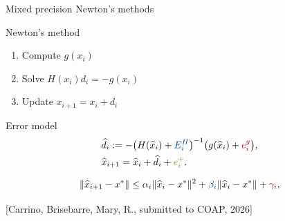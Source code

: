 \documentclass{beamer}
\def\norm#1{\|#1\|}
\newcommand{\limacc}{\gamma_i}
\begin{document}
\begin{frame}{Mixed precision Newton's methods}

\begin{tcolorbox}{Newton's method}
   \begin{enumerate}
   \item  Compute $g(x_i)$       
    \item  Solve $H(x_i)d_i = -g(x_i)$    
 \item  Update $x_{i+1} = x_i + d_i$ 
  \end{enumerate}
\end{tcolorbox}

\begin{tcolorbox}{Error model}
  \begin{align*}
      &\widehat{d}_i := - \big(H(\widehat{x}_i) + \textcolor{myblue}{E^H_i}\big)^{-1}\big(g(\widehat{x}_i) +\textcolor{red!70!black}{e^g_i}\big), \\
      &\widehat{x}_{i+1} =  \widehat{x}_i + \widehat{d}_i + \textcolor{myyel!70!black}{e^+_i}.
  \end{align*}
\end{tcolorbox}
      
      \pause
 
  \begin{tcolorbox}[
  title={Local convergence analysis},
      colback=white,
      colframe=gray!40,
      boxrule=0.4pt,
      arc=4pt,
      left=6pt, right=6pt, top=4pt, bottom=4pt,
    ]
  \begin{equation*}
      \norm{ \widehat{x}_{i+1} - x^*} \leq
     \alpha_i\norm{\widehat{x}_i - x^*}^2
      +\textcolor{myblue}{\beta_i}\norm{ \widehat{x}_i -x^* }
      +\textcolor{red!70!black}{\limacc},
    \end{equation*}
   
    \end{tcolorbox}
      \small{ \textcolor{mygreen}{[Carrino, Brisebarre, Mary, R., submitted to COAP, 2026]}}

    \end{frame}
    
\end{document}
